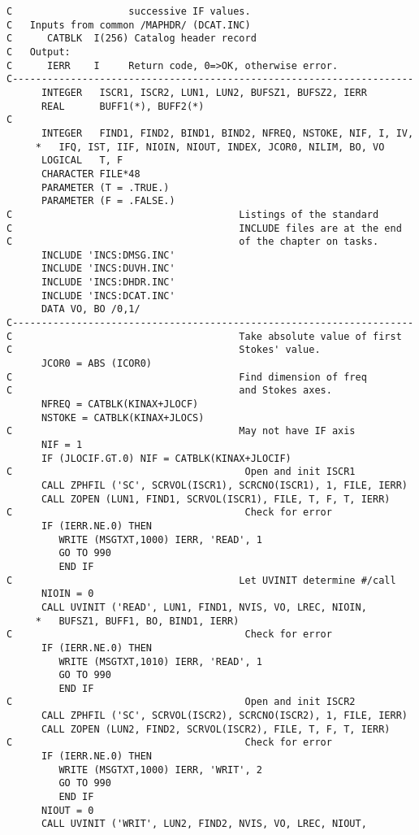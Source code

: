 \begin{verbatim}
C                    successive IF values.
C   Inputs from common /MAPHDR/ (DCAT.INC)
C      CATBLK  I(256) Catalog header record
C   Output:
C      IERR    I     Return code, 0=>OK, otherwise error.
C---------------------------------------------------------------------
      INTEGER   ISCR1, ISCR2, LUN1, LUN2, BUFSZ1, BUFSZ2, IERR
      REAL      BUFF1(*), BUFF2(*)
C
      INTEGER   FIND1, FIND2, BIND1, BIND2, NFREQ, NSTOKE, NIF, I, IV,
     *   IFQ, IST, IIF, NIOIN, NIOUT, INDEX, JCOR0, NILIM, BO, VO
      LOGICAL   T, F
      CHARACTER FILE*48
      PARAMETER (T = .TRUE.)
      PARAMETER (F = .FALSE.)
C                                       Listings of the standard
C                                       INCLUDE files are at the end
C                                       of the chapter on tasks.
      INCLUDE 'INCS:DMSG.INC'
      INCLUDE 'INCS:DUVH.INC'
      INCLUDE 'INCS:DHDR.INC'
      INCLUDE 'INCS:DCAT.INC'
      DATA VO, BO /0,1/
C---------------------------------------------------------------------
C                                       Take absolute value of first
C                                       Stokes' value.
      JCOR0 = ABS (ICOR0)
C                                       Find dimension of freq
C                                       and Stokes axes.
      NFREQ = CATBLK(KINAX+JLOCF)
      NSTOKE = CATBLK(KINAX+JLOCS)
C                                       May not have IF axis
      NIF = 1
      IF (JLOCIF.GT.0) NIF = CATBLK(KINAX+JLOCIF)
C                                        Open and init ISCR1
      CALL ZPHFIL ('SC', SCRVOL(ISCR1), SCRCNO(ISCR1), 1, FILE, IERR)
      CALL ZOPEN (LUN1, FIND1, SCRVOL(ISCR1), FILE, T, F, T, IERR)
C                                        Check for error
      IF (IERR.NE.0) THEN
         WRITE (MSGTXT,1000) IERR, 'READ', 1
         GO TO 990
         END IF
C                                       Let UVINIT determine #/call
      NIOIN = 0
      CALL UVINIT ('READ', LUN1, FIND1, NVIS, VO, LREC, NIOIN,
     *   BUFSZ1, BUFF1, BO, BIND1, IERR)
C                                        Check for error
      IF (IERR.NE.0) THEN
         WRITE (MSGTXT,1010) IERR, 'READ', 1
         GO TO 990
         END IF
C                                        Open and init ISCR2
      CALL ZPHFIL ('SC', SCRVOL(ISCR2), SCRCNO(ISCR2), 1, FILE, IERR)
      CALL ZOPEN (LUN2, FIND2, SCRVOL(ISCR2), FILE, T, F, T, IERR)
C                                        Check for error
      IF (IERR.NE.0) THEN
         WRITE (MSGTXT,1000) IERR, 'WRIT', 2
         GO TO 990
         END IF
      NIOUT = 0
      CALL UVINIT ('WRIT', LUN2, FIND2, NVIS, VO, LREC, NIOUT,

\end{verbatim}
